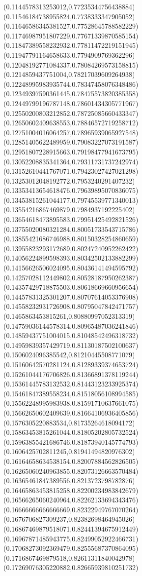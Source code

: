 \documentclass[12pt]{article}
\theoremstyle{plain}
\theoremstyle{definition}
\theoremstyle{remark}
\begin{document}
\begin{figure}
{  (0.1144578313253012,0.77235344756438884)%
  (0.11546184738955824,0.7738333347905052)%
  (0.11646586345381527,0.77528645788582229)%
  (0.11746987951807229,0.77671339870585154)%
  (0.11847389558232932,0.77811472219151945)%
  (0.11947791164658633,0.7794909769362296)%
  (0.12048192771084337,0.78084269573158815)%
  (0.1214859437751004,0.78217039609264938)%
  (0.12248995983935744,0.78347458076348486)%
  (0.12349397590361445,0.78475573820385358)%
  (0.12449799196787148,0.78601434305771967)%
  (0.12550200803212852,0.78725085660433347)%
  (0.12650602409638553,0.78846572719258712)%
  (0.12751004016064257,0.78965939065927548)%
  (0.12851405622489959,0.79083227073191587)%
  (0.12951807228915663,0.79198477941673795)%
  (0.13052208835341364,0.79311731737242974)%
  (0.13152610441767071,0.79423027427021298)%
  (0.13253012048192772,0.7953240291407232)%
  (0.13353413654618476,0.79639895070836075)%
  (0.13453815261044177,0.79745539771340013)%
  (0.13554216867469879,0.7984937192225402)%
  (0.13654618473895583,0.79951425492821526)%
  (0.13755020080321284,0.80051733543715786)%
  (0.13855421686746988,0.80150328254860659)%
  (0.13955823293172689,0.80247240952262422)%
  (0.14056224899598393,0.80342502133882299)%
  (0.14156626506024095,0.80436141494595792)%
  (0.14257028112449802,0.80528187950262387)%
  (0.14357429718875503,0.80618669660956654)%
  (0.14457831325301207,0.80707614053376908)%
  (0.14558232931726908,0.80795047842471757)%
  (0.1465863453815261,0.80880997052313319)%
  (0.14759036144578314,0.80965487036241846)%
  (0.14859437751004015,0.81048542496318732)%
  (0.14959839357429719,0.81130187502100637)%
  (0.1506024096385542,0.81210445508771079)%
  (0.15160642570281124,0.81289339374653724)%
  (0.15261044176706826,0.81366891378119244)%
  (0.15361445783132532,0.81443123233925374)%
  (0.15461847389558234,0.81518056108994585)%
  (0.15562248995983938,0.81591710637661075)%
  (0.15662650602409639,0.81664106936405856)%
  (0.1576305220883534,0.81735264618094172)%
  (0.15863453815261044,0.81805202805732524)%
  (0.15963855421686746,0.81873940145774793)%
  (0.1606425702811245,0.81941494820976302)%
  (0.16164658634538154,0.82007884562826505)%
  (0.16265060240963855,0.82073126663570484)%
  (0.16365461847389556,0.8213723798782876)%
  (0.16465863453815258,0.82200234983842679)%
  (0.16566265060240964,0.82262133694343476)%
  (0.16666666666666669,0.82322949767070264)%
  (0.1676706827309237,0.82382698464945026)%
  (0.16867469879518071,0.82441394675912449)%
  (0.16967871485943775,0.82499052922466731)%
  (0.17068273092369479,0.82555687370864095)%
  (0.1716867469879518,0.82611311840042978)%
  (0.17269076305220882,0.82665939810251732)%
}
\end{figure}
\end{document}
